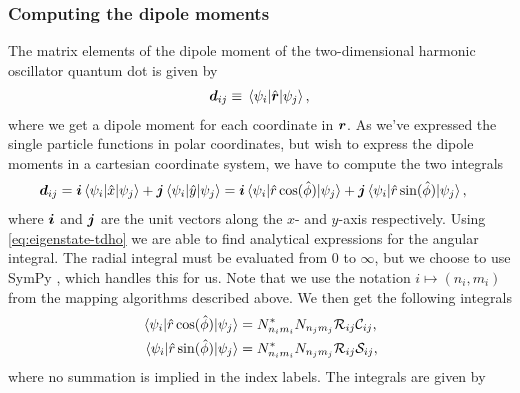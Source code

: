         \subsubsection{Computing the dipole moments}
            The matrix elements of the dipole moment of the two-dimensional
            harmonic oscillator quantum dot is given by
            \begin{align}
                \boldsymbol{d}_{ij}
                \equiv \mel*{\psi_i}{\hat{\boldsymbol{r}}}{\psi_j},
            \end{align}
            where we get a dipole moment for each coordinate in $\boldsymbol{r}$.
            As we've expressed the single particle functions in polar
            coordinates, but wish to express the dipole moments in a cartesian
            coordinate system, we have to compute the two integrals
            \begin{align}
                \vf{d}_{ij}
                &= \vf{i}\mel*{\psi_i}{\position}{\psi_j}
                + \vf{j}\mel*{\psi_i}{\position[y]}{\psi_j}
                = \vf{i}\mel*{\psi_i}{\hat{r} \cosine(\hat{\phi})}{\psi_j}
                + \vf{j}\mel*{\psi_i}{\hat{r} \sine(\hat{\phi})}{\psi_j},
                \label{eq:dipole_elements}
            \end{align}
            where $\boldsymbol{i}$ and $\boldsymbol{j}$ are the unit vectors along the $x$- and
            $y$-axis respectively.
            Using \autoref{eq:eigenstate-tdho} we are able to find analytical
            expressions for the angular integral.
            The radial integral must be evaluated from $0$ to $\infty$, but we
            choose to use SymPy \cite{sympy}, which handles this for us.
            Note that we use the notation $i \mapsto (n_i, m_i)$ from the
            mapping algorithms described above.
            We then get the following integrals
            \begin{align}
                \mel*{\psi_i}{\hat{r} \cosine(\hat{\phi})}{\psi_j}
                &= N^{*}_{n_i m_i} N_{n_j m_j}
                \mathcal{R}_{ij}
                \mathcal{C}_{ij},
                \\
                \mel*{\psi_i}{\hat{r} \sine(\hat{\phi})}{\psi_j}
                &= N^{*}_{n_i m_i} N_{n_j m_j}
                \mathcal{R}_{ij}
                \mathcal{S}_{ij},
            \end{align}
            where no summation is implied in the index labels.
            The integrals are given by
